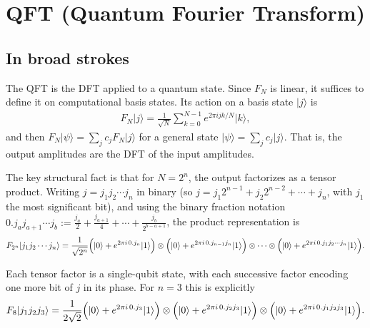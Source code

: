 \documentclass[11pt]{article}
\begin{document}
\section{QFT (Quantum Fourier Transform)}

\subsection{In broad strokes}

The QFT is the DFT applied to a quantum state. Since $F_N$ is linear, it suffices to define it on computational basis states. Its action on a basis state $\vert j \rangle$ is
\begin{align*}
F_N \vert j \rangle = \frac{1}{\sqrt{N}} \sum_{k=0}^{N-1} e^{2\pi i jk/N} \vert k \rangle,
\end{align*}
and then $F_N \vert \psi \rangle = \sum_j c_j F_N \vert j \rangle$ for a general state $\vert \psi \rangle = \sum_j c_j \vert j \rangle$. That is, the output amplitudes are the DFT of the input amplitudes.

The key structural fact is that for $N = 2^n$, the output factorizes as a tensor product. Writing $j = j_1 j_2 \cdots j_n$ in binary (so $j = j_1 2^{n-1} + j_2 2^{n-2} + \cdots + j_n$, with $j_1$ the most significant bit), and using the binary fraction notation $0.j_a j_{a+1} \cdots j_b := \frac{j_a}{2} + \frac{j_{a+1}}{4} + \cdots + \frac{j_b}{2^{b-a+1}}$, the product representation is \cite{Barros_2026}
\begin{align*}
F_{2^n}\vert j_1 j_2 \cdots j_n\rangle = \frac{1}{\sqrt{2^n}}
\Bigl(\vert 0\rangle + e^{2\pi i\, 0.j_n}\vert 1\rangle\Bigr)
\otimes
\Bigl(\vert 0\rangle + e^{2\pi i\, 0.j_{n-1}j_n}\vert 1\rangle\Bigr)
\otimes \cdots \otimes
\Bigl(\vert 0\rangle + e^{2\pi i\, 0.j_1 j_2 \cdots j_n}\vert 1\rangle\Bigr).
\end{align*}

Each tensor factor is a single-qubit state, with each successive factor encoding one more bit of $j$ in its phase. For $n = 3$ this is explicitly
\begin{align*}
F_8\vert j_1 j_2 j_3\rangle = \frac{1}{2\sqrt{2}}
\Bigl(\vert 0\rangle + e^{2\pi i\, 0.j_3}\vert 1\rangle\Bigr)
\otimes
\Bigl(\vert 0\rangle + e^{2\pi i\, 0.j_2 j_3}\vert 1\rangle\Bigr)
\otimes
\Bigl(\vert 0\rangle + e^{2\pi i\, 0.j_1 j_2 j_3}\vert 1\rangle\Bigr).
\end{align*}
\end{document}
